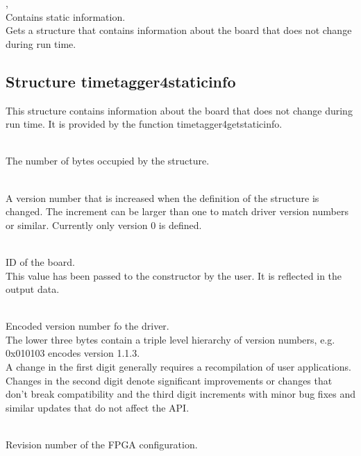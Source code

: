 			,\\
			Contains static information.\\
			Gets a structure that contains information about the board that does not change during run time.\par

		\subsection{Structure timetagger4\tu static\tu info}

			This structure contains information about the board that does not change during run time. It is provided by the function \textsf{timetagger4\tu get\tu static\tu info}.\par

			\\
			The number of bytes occupied by the structure.

			\\
			A version number that is increased when the definition of the structure is changed. The increment can be larger than one to match driver version numbers or similar. Currently only version 0 is defined.\par


			\\
			ID of the board.\\
			This value has been passed to the constructor by the user. It is reflected in the output data.\par

			\\
			Encoded version number fo the driver.\\
			The lower three bytes contain a triple level hierarchy of version numbers, e.g. 0x010103 encodes version 1.1.3.\\
			A change in the first digit generally requires a recompilation of user applications. 
			Changes in the second digit denote significant improvements or changes that don't break compatibility 
			and the third digit increments with minor bug fixes and similar updates that do not affect the API.\par

			\\
			Revision number of the FPGA configuration.

